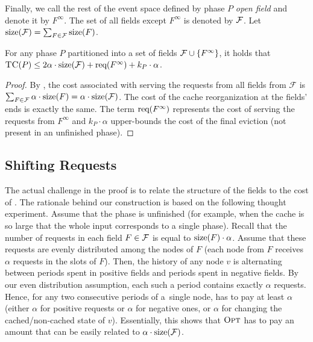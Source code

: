 Finally, we call the rest of the event space defined by phase $P$
\emph{open field} and denote it by $F^\infty$. The set of all fields except $
F^\infty$ is denoted by $\mathcal{F}$. Let $\textrm{size}(\mathcal{F}) = \sum_{F \in \mathcal{F}} \textrm{size}(F)$.

\begin{lemma}
\label{lem:alg_cost}
For any phase $P$ partitioned into a set of fields $\mathcal{F} \cup \{ F^\infty \}$,
it holds that $\textsc{TC}(P) \leq 2 \alpha \cdot \textrm{size}(\mathcal{F}) + \textrm{req}(F^\infty) + k_P
\cdot \alpha$.
\end{lemma}

\begin{proof}
By , the cost associated with serving
the requests from all fields from $\mathcal{F}$ is $\sum_{F \in \mathcal{F}} \alpha
\cdot \textrm{size}(F) = \alpha \cdot \textrm{size}(\mathcal{F})$. The cost of the cache reorganization
at the fields' ends is exactly the same. The term $\textrm{req}(F^\infty)$ represents
the cost of serving the requests from $F^\infty$ and $k_P \cdot \alpha$
upper-bounds the cost of the final eviction (not present in an unfinished
phase).
\end{proof}




\subsection{Shifting Requests}\label{sec:shifting}

The actual challenge in the proof is to relate the structure of the fields to
the cost of {\OPT}. The rationale behind our construction is based on the
following thought experiment. Assume that the phase is unfinished (for
example, when the cache is so large that the whole input corresponds to a
single phase). Recall that the number of requests in each field $F \in \mathcal{F}$ is
equal to $\textrm{size}(F) \cdot \alpha$. Assume that these requests are evenly
distributed among the nodes of $F$ (each node from $F$ receives $\alpha$
requests in the slots of $F$). Then, the history of any node $v$ is
alternating between periods spent in positive fields and periods spent in
negative fields. By our even distribution assumption, each such a period
contains exactly $\alpha$ requests. Hence, for any two consecutive periods of
a~single node, \OPT has to pay at least $\alpha$ (either $\alpha$ for positive
requests or $\alpha$ for negative ones, or $\alpha$ for changing the
cached/non-cached state of $v$). Essentially, this shows that $\textsc{Opt}$ has to
pay an amount that can be easily related to $\alpha \cdot
\textrm{size}(\mathcal{F})$.

